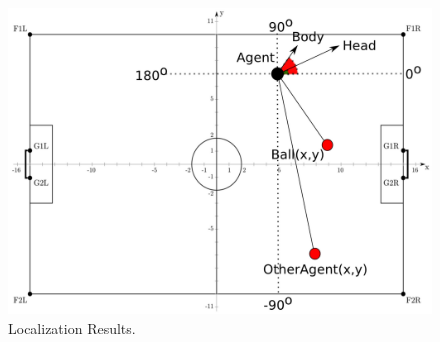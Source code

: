 \begin{figure}[htb!]
\centering
  \includegraphics[scale=0.5]{Chapter3/figures/LocalizationResults.pdf}
  \caption{Localization Results.} 
  \label{fig:LocalizationResults}
\end{figure}
\hfill









